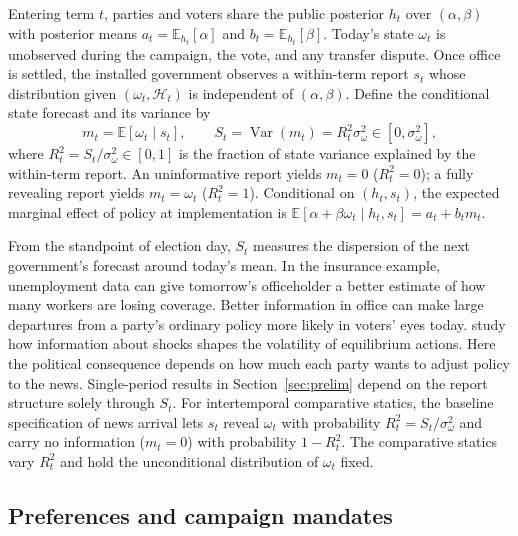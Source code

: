 \documentclass[11pt,letterpaper]{article}
\newcommand{\E}{\mathbb E}
\newcommand{\Var}{\operatorname{Var}}
\begin{document}
Entering term $t$, parties and voters share the public posterior $h_t$ over $(\alpha,\beta)$ with posterior means $a_t=\E_{h_t}[\alpha]$ and $b_t=\E_{h_t}[\beta]$. Today's state $\omega_t$ is unobserved during the campaign, the vote, and any transfer dispute. Once office is settled, the installed government observes a within-term report $s_t$ whose distribution given $(\omega_t,\mathcal H_t)$ is independent of $(\alpha,\beta)$. Define the conditional state forecast and its variance by
\begin{equation}
 m_t=\E[\omega_t\mid s_t],\qquad
 S_t=\Var(m_t)=R_t^2\sigma_\omega^2 \in[0,\sigma_\omega^2],
 \label{eq:monitoring}
\end{equation}
where $R_t^2=S_t/\sigma_\omega^2\in[0,1]$ is the fraction of state variance explained by the within-term report. An uninformative report yields $m_t=0$ ($R_t^2=0$); a fully revealing report yields $m_t=\omega_t$ ($R_t^2=1$). Conditional on $(h_t,s_t)$, the expected marginal effect of policy at implementation is $\E[\alpha+\beta\omega_t\mid h_t,s_t]=a_t+b_t m_t$.

From the standpoint of election day, $S_t$ measures the dispersion of the next government's forecast around today's mean. In the insurance example, unemployment data can give tomorrow's officeholder a better estimate of how many workers are losing coverage. Better information in office can make large departures from a party's ordinary policy more likely in voters' eyes today. \citet*{bergemannheumannmorris} study how information about shocks shapes the volatility of equilibrium actions. Here the political consequence depends on how much each party wants to adjust policy to the news. Single-period results in Section~\ref{sec:prelim} depend on the report structure solely through $S_t$. For intertemporal comparative statics, the baseline specification of news arrival lets $s_t$ reveal $\omega_t$ with probability $R_t^2=S_t/\sigma_\omega^2$ and carry no information ($m_t=0$) with probability $1-R_t^2$. The comparative statics vary $R_t^2$ and hold the unconditional distribution of $\omega_t$ fixed.

\subsection{Preferences and campaign mandates}
\end{document}
